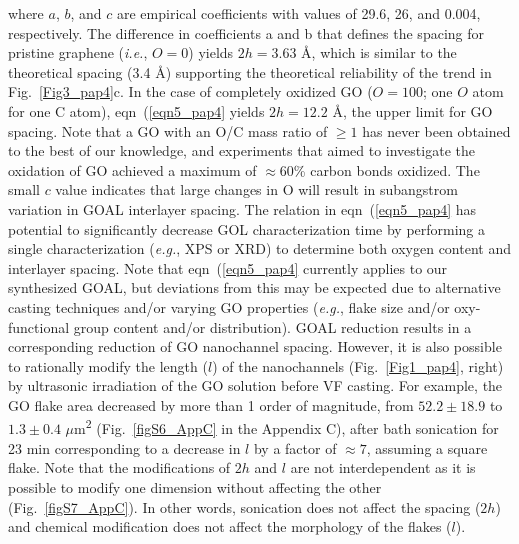 where $a$, $b$, and $c$ are empirical coefficients with values of 29.6, 26, and 0.004, respectively. The difference in coefficients a and b that defines the spacing for pristine graphene (\textit{i.e.}, $O = 0$) yields $2h = 3.63 $ {\AA}, which is similar to the theoretical spacing (3.4 {\AA}) supporting the theoretical reliability of the trend in Fig.~\ref{Fig3_pap4}c. In the case of completely oxidized GO ($O = 100$; one $O$ atom for one C atom), eqn~(\ref{eqn5_pap4} yields $2h = 12.2$ {\AA}, the upper limit for GO spacing. Note that a GO with an O/C mass ratio of $\geq1$ has never been obtained to the best of our knowledge, and experiments that aimed to investigate the oxidation of GO achieved a maximum of $\approx60$\% carbon bonds oxidized.\cite{ying2014plane} The small $c$ value indicates that large changes in O will result in subangstrom variation in GOAL interlayer spacing. The relation in eqn~(\ref{eqn5_pap4}  has potential to significantly decrease GOL characterization time by performing a single characterization (\textit{e.g.}, XPS or XRD) to determine both oxygen content and interlayer spacing. Note that eqn~(\ref{eqn5_pap4} currently applies to our synthesized GOAL, but deviations from this may be expected due to alternative casting techniques and/or varying GO properties (\textit{e.g.}, flake size and/or oxy-functional group content and/or distribution).
GOAL reduction results in a corresponding reduction of GO nanochannel spacing. However, it is also possible to rationally modify the length ($l$) of the nanochannels (Fig.~\ref{Fig1_pap4}, right) by ultrasonic irradiation of the GO solution before VF casting.\cite{amadei2016fabrication} For example, the GO flake area decreased by more than 1 order of magnitude, from $52.2\pm18.9$ to $1.3\pm0.4$ $\mu$m\textsuperscript{2} (Fig.~\ref{figS6_AppC} in the Appendix C), after bath sonication for 23 min corresponding to a decrease in $l$ by a factor of $\approx7$, assuming a square flake. Note that the modifications of $2h$ and $l$ are not interdependent as it is possible to modify one dimension without affecting the other (Fig.~\ref{figS7_AppC}). In other words, sonication does not affect the spacing ($2h$) and chemical modification does not affect the morphology of the flakes ($l$).\\
